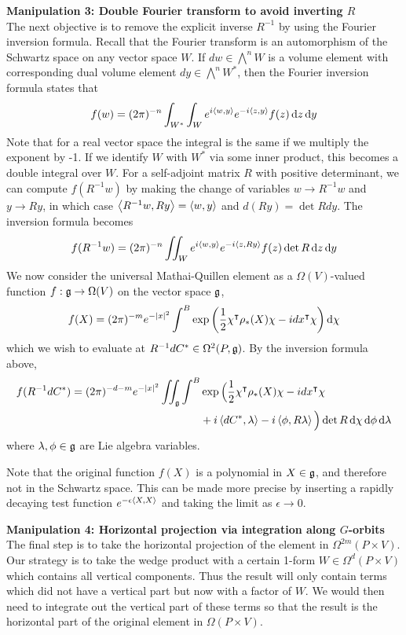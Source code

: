 \vspace{1ex}\noindent
\textbf{Manipulation 3: Double Fourier transform to avoid inverting $R$} \\
The next objective is to remove the explicit inverse $R^{-1}$ by using the
Fourier inversion formula. Recall that the Fourier transform is an automorphism
of the Schwartz space on any vector space $W$. If  $dw\in\bigwedge^n W$ is a
volume element with corresponding dual volume element $dy\in \bigwedge^nW^*$,
then the Fourier inversion formula states that 
\[
	f(w) =
	(2\pi)^{-n}\int_{W^*}\int_{W}e^{i\gen{w,y}}e^{-i\gen{z,y}}f(z)\odif{z}\odif{y}
\] 
Note that for a real vector space the integral is the same if we multiply the
exponent by -1.
If we identify $W$ with  $W^*$ via some inner product, this becomes a double
integral over $W$. For a self-adjoint matrix $R$ with positive determinant, we
can compute  $f(R^{-1}w)$ by making the change of variables $w \to R^{-1}w$ and
$y\to Ry$, in which case $\gen{R^{-1}w,Ry}=\gen{w,y}$ and $d(Ry)=\det R dy$. 
The inversion formula becomes
\[
f(R^{-1}w) = (2\pi)^{-n}\iint_W e^{i\gen{w,y}}e^{-i\gen{z,Ry}}f(z)\det R\odif{z}\odif{y}
\] 
We now consider the universal Mathai-Quillen element as a $\Omega(V)$-valued 
function $f:\operatorname{\mathfrak{g}} \to \Omega(V)$ on the vector space $\operatorname{\mathfrak{g}}$, 
\[
f(X) = (2\pi)^{-m}e^{-\abs{x}^2}\int^B
	\exp\paren{\frac{1}{2}\chi^{\intercal}\rho_*(X)\chi - idx^\intercal \chi}
	\odif{\chi}
\] 
which we wish to
evaluate at $R^{-1}dC^* \in \Omega^2(P,\operatorname{\mathfrak{g}})$. By the inversion formula above,
\begin{align} \label{eq:fourier_thom}
	f(R^{-1}dC^*) = (2\pi)^{-d-m}e^{-\abs{x}^2}\iint_{\g}\int^B 
	&\exp\Big(\frac{1}{2}\chi^{\intercal}\rho_*(X)\chi - idx^\intercal \chi\\
	&+i\gen{dC^*,\lambda}-i\gen{\phi,R\lambda}\Big) \det R
	\odif{\chi} \odif{\phi}\odif{\lambda} \nonumber
\end{align}
where $\lambda, \phi \in \operatorname{\mathfrak{g}}$ are Lie algebra variables. 
\begin{remark} %
	Note that the original function $f(X)$ is a polynomial in $X\in\operatorname{\mathfrak{g}}$, and
	therefore not in the Schwartz space. This can be made more precise by
	inserting a rapidly decaying test function $e^{-\epsilon\gen{X,X}}$ and
	taking the limit as $\epsilon\to 0$.
\end{remark}

\vspace{1ex}\noindent
\textbf{Manipulation 4: Horizontal projection via integration along $G$-orbits} \\
The final step is to take the horizontal projection of the element in
$\Omega^{2m}(P\times V)$. Our strategy is to take the wedge product with a
certain 1-form $W\in\Omega^d(P\times V)$ which contains all vertical components. 
Thus the result will
only contain terms which did not have a vertical part but now with a factor of 
$W$. We would then need to integrate out the vertical part of these terms so
that the result is the horizontal part of the original element in
$\Omega(P\times V)$.

